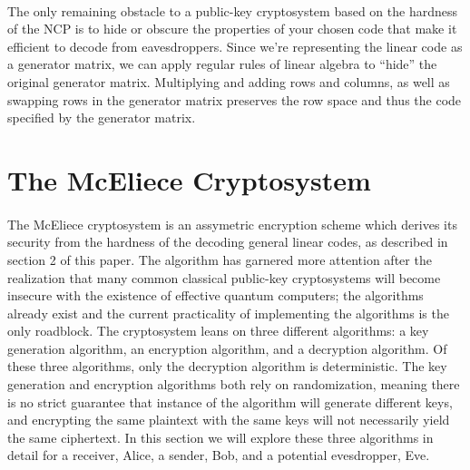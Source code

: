 \documentclass[12pt]{article}
\theoremstyle{definition}
\begin{document}
\paragraph{}
The only remaining obstacle to a public-key cryptosystem based on the hardness of the NCP is to hide or obscure the properties of your chosen code that make it efficient to decode from eavesdroppers. Since we're representing the linear code as a generator matrix, we can apply regular rules of linear algebra to ``hide'' the original generator matrix. Multiplying and adding rows and columns, as well as swapping rows in the generator matrix preserves the row space and thus the code specified by the generator matrix.

\section{The McEliece Cryptosystem}
\paragraph{} The McEliece cryptosystem is an assymetric encryption scheme which derives its security from the hardness of the decoding general linear codes, as described in section 2 of this paper.  The algorithm has garnered more attention after the realization that many common classical public-key cryptosystems will become insecure with the existence of effective quantum computers; the algorithms already exist and the current practicality of implementing the algorithms is the only roadblock.  The cryptosystem leans on three different algorithms: a key generation algorithm, an encryption algorithm, and a decryption algorithm.  Of these three algorithms, only the decryption algorithm is deterministic.  The key generation and encryption algorithms both rely on randomization, meaning there is no strict guarantee that instance of the algorithm will generate different keys, and encrypting the same plaintext with the same keys will not necessarily yield the same ciphertext.  In this section we will explore these three algorithms in detail for a receiver, Alice, a sender, Bob, and a potential evesdropper, Eve.
\end{document}
